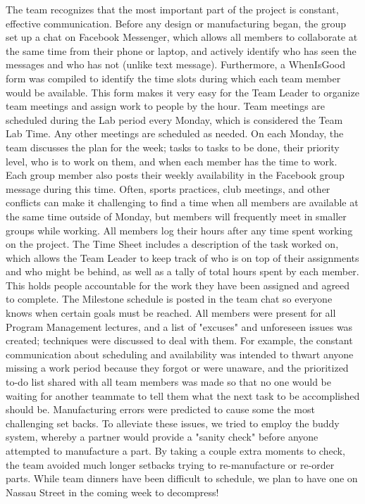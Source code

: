 \documentclass[12pt]{article}
\begin{document}
The team recognizes that the most important part of the project is constant, effective communication. Before any design or manufacturing began, the group set up a chat on Facebook Messenger, which allows all members to collaborate at the same time from their phone or laptop, and actively identify who has seen the messages and who has not (unlike text message). Furthermore, a WhenIsGood form was compiled to identify the time slots during which each team member would be available. This form makes it very easy for the Team Leader to organize team meetings and assign work to people by the hour. Team meetings are scheduled during the Lab period every Monday, which is considered the Team Lab Time. Any other meetings are scheduled as needed. On each Monday, the team discusses the plan for the week; tasks to tasks to be done, their priority level, who is to work on them, and when each member has the time to work. Each group member also posts their weekly availability in the Facebook group message during this time. Often, sports practices, club meetings, and other conflicts can make it challenging to find a time when all members are available at the same time outside of Monday, but members will frequently meet in smaller groups while working. All members log their hours after any time spent working on the project. The Time Sheet includes a description of the task worked on, which allows the Team Leader to keep track of who is on top of their assignments and who might be behind, as well as a tally of total hours spent by each member. This holds people accountable for the work they have been assigned and agreed to complete. The Milestone schedule is posted in the team chat so everyone knows when certain goals must be reached. All members were present for all Program Management lectures, and a list of "excuses" and unforeseen issues was created; techniques were discussed to deal with them. For example, the constant communication about scheduling and availability was intended to thwart anyone missing a work period because they forgot or were unaware, and the prioritized to-do list shared with all team members was made so that no one would be waiting for another teammate to tell them what the next task to be accomplished should be. Manufacturing errors were predicted to cause some the most challenging set backs. To alleviate these issues, we tried to employ the buddy system, whereby a partner would provide a "sanity check" before anyone attempted to manufacture a part. By taking a couple extra moments to check, the team avoided much longer setbacks trying to re-manufacture or re-order parts. While team dinners have been difficult to schedule, we plan to have one on Nassau Street in the coming week to decompress!
\end{document}

